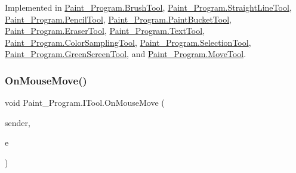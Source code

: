 Implemented in \mbox{\hyperlink{class_paint___program_1_1_brush_tool_a66b7dbcbb7af665e48b14d9e70a8d22d}{Paint\+\_\+\+Program.\+Brush\+Tool}}, \mbox{\hyperlink{class_paint___program_1_1_straight_line_tool_a75f5c2ed8c11fef038f458324e1213f2}{Paint\+\_\+\+Program.\+Straight\+Line\+Tool}}, \mbox{\hyperlink{class_paint___program_1_1_pencil_tool_a559e17e6afc05dde7278d4b69b05b12d}{Paint\+\_\+\+Program.\+Pencil\+Tool}}, \mbox{\hyperlink{class_paint___program_1_1_paint_bucket_tool_a468286c5eb5f2a49fe92387b9c859398}{Paint\+\_\+\+Program.\+Paint\+Bucket\+Tool}}, \mbox{\hyperlink{class_paint___program_1_1_eraser_tool_a4af3cc5379de2a2aec2a5d622801ca86}{Paint\+\_\+\+Program.\+Eraser\+Tool}}, \mbox{\hyperlink{class_paint___program_1_1_text_tool_a56294ea8e94d8aa58282660c24eb74bb}{Paint\+\_\+\+Program.\+Text\+Tool}}, \mbox{\hyperlink{class_paint___program_1_1_color_sampling_tool_a511da95eb2072dc913d8053ba405fb2a}{Paint\+\_\+\+Program.\+Color\+Sampling\+Tool}}, \mbox{\hyperlink{class_paint___program_1_1_selection_tool_a1134ee98cfa46d98871716ede5f08d1f}{Paint\+\_\+\+Program.\+Selection\+Tool}}, \mbox{\hyperlink{class_paint___program_1_1_green_screen_tool_ae3a5e35c0921093957b7cccde92e1b91}{Paint\+\_\+\+Program.\+Green\+Screen\+Tool}}, and \mbox{\hyperlink{class_paint___program_1_1_move_tool_a0dc263e08c2709e63672d545c0ac03c2}{Paint\+\_\+\+Program.\+Move\+Tool}}.

\mbox{\label{interface_paint___program_1_1_i_tool_a6a1cbe840b5cfc8a9b9463cc21590845}} 
\subsubsection{\texorpdfstring{On\+Mouse\+Move()}{OnMouseMove()}}
{\footnotesize\ttfamily void Paint\+\_\+\+Program.\+I\+Tool.\+On\+Mouse\+Move (\begin{DoxyParamCaption}\item[{object}]{sender,  }\item[{Mouse\+Event\+Args}]{e }\end{DoxyParamCaption})}



